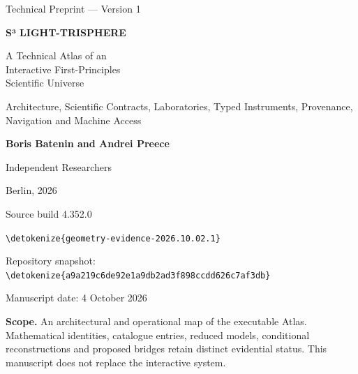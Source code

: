\documentclass[11pt,a4paper]{article}
\newcommand{\id}[1]{\expandafter\nolinkurl\expandafter{\detokenize{#1}}}
\begin{document}
\begin{titlepage}
\vspace*{18mm}
{\Large\sffamily Technical Preprint — Version 1\par}
\vspace{14mm}
{\Huge\bfseries S³ LIGHT-TRISPHERE\par}
\vspace{8mm}
{\LARGE A Technical Atlas of an\\ Interactive First-Principles\\ Scientific Universe\par}
\vspace{12mm}
{\large Architecture, Scientific Contracts, Laboratories, Typed Instruments, Provenance, Navigation and Machine Access\par}
\vspace{12mm}
{\Large\bfseries Boris Batenin and Andrei Preece\par}
\vspace{3mm}
{\large Independent Researchers\par}
\vspace{3mm}
{\large Berlin, 2026\par}
\vfill
{\large Source build 4.352.0\par}
\id{geometry-evidence-2026.10.02.1}\par
Repository snapshot: \id{a9a219c6de92e1a9db2ad3f898ccdd626c7af3db}\par
Manuscript date: 4 October 2026\par
\vspace{8mm}
\textbf{Scope.} An architectural and operational map of the executable Atlas. Mathematical identities, catalogue entries, reduced models, conditional reconstructions and proposed bridges retain distinct evidential status. This manuscript does not replace the interactive system.
\end{titlepage}
\end{document}
